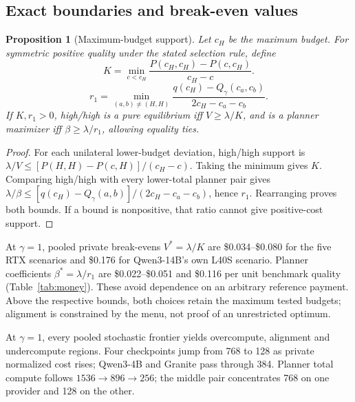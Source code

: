 \documentclass[sigconf,anonymous,nonacm]{acmart}
\newtheorem{proposition}{Proposition}
\begin{document}
\subsection{Exact boundaries and break-even values}\label{sec:allocation}
\begin{proposition}[Maximum-budget support]\label{prop:maxsupport}
Let $c_H$ be the maximum budget. For symmetric positive quality under the stated selection rule, define
\[
K=\min_{c<c_H}\frac{P(c_H,c_H)-P(c,c_H)}{c_H-c}.\]
\[
r_1=\min_{(a,b)\ne(H,H)}\frac{q(c_H)-Q_\gamma(c_a,c_b)}{2c_H-c_a-c_b}.
\]
If $K,r_1>0$, high/high is a pure equilibrium iff $V\geq\lambda/K$, and is a planner maximizer iff $\beta\geq\lambda/r_1$, allowing equality ties.
\end{proposition}
\begin{proof}
For each unilateral lower-budget deviation, high/high support is $\lambda/V\leq[P(H,H)-P(c,H)]/(c_H-c)$. Taking the minimum gives $K$. Comparing high/high with every lower-total planner pair gives $\lambda/\beta\leq[q(c_H)-Q_\gamma(a,b)]/(2c_H-c_a-c_b)$, hence $r_1$. Rearranging proves both bounds. If a bound is nonpositive, that ratio cannot give positive-cost support.
\end{proof}
At $\gamma=1$, pooled private break-evens $V^*=\lambda/K$ are \$0.034--\$0.080 for the five RTX scenarios and \$0.176 for Qwen3-14B's own L40S scenario. Planner coefficients $\beta^*=\lambda/r_1$ are \$0.022--\$0.051 and \$0.116 per unit benchmark quality (Table~\ref{tab:money}). These avoid dependence on an arbitrary reference payment. Above the respective bounds, both choices retain the maximum tested budgets; alignment is constrained by the menu, not proof of an unrestricted optimum.

At $\gamma=1$, every pooled stochastic frontier yields overcompute, alignment and undercompute regions. Four checkpoints jump from 768 to 128 as private normalized cost rises; Qwen3-4B and Granite pass through 384. Planner total compute follows $1536\to896\to256$; the middle pair concentrates 768 on one provider and 128 on the other.
\end{document}
